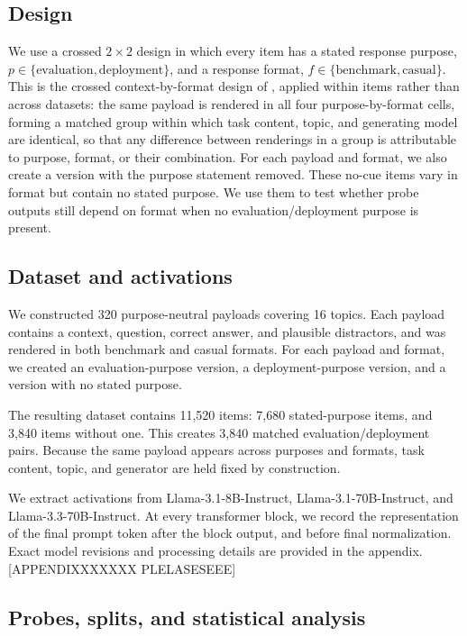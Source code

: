 \documentclass{article}
\begin{document}
\subsection{Design}
We use a crossed $2\times2$ design in which every item has a stated response purpose, $p\in\{\mathrm{evaluation},\mathrm{deployment}\}$, and a response
format, $f\in\{\mathrm{benchmark},\mathrm{casual}\}$. 
This is the crossed context-by-format design of \citet{devbunova2026format}, applied within items rather than across datasets: the same payload is rendered in all four purpose-by-format cells, forming a matched group within which task content, topic, and generating model are identical, so that any difference between renderings in a group is attributable to purpose, format, or their combination. 
For each payload and format, we also create a version with the purpose statement removed.
These no-cue items vary in format but contain no stated purpose. We use them to test whether probe outputs still depend on format when no evaluation/deployment purpose is present.
\endgroup




\subsection{Dataset and activations}
We constructed 320 purpose-neutral payloads covering 16 topics. Each payload contains a context, question, correct answer, and plausible distractors, and was rendered in both benchmark and casual formats. For each payload and format, we created an evaluation-purpose version, a deployment-purpose version, and a version with no stated purpose.

The resulting dataset contains 11{,}520 items: 7{,}680 stated-purpose items, and  3{,}840 items without one. This creates 3{,}840 matched evaluation/deployment pairs.
Because the same payload appears across purposes and formats, task content, topic, and generator are held fixed by construction.

We extract activations from Llama-3.1-8B-Instruct, Llama-3.1-70B-Instruct, and Llama-3.3-70B-Instruct. At every transformer block, we record the representation of the final prompt token after the block output, and before final normalization. 
Exact model revisions and processing details are provided in the appendix. [APPENDIXXXXXXX PLELASESEEE]

\subsection{Probes, splits, and statistical analysis}
\end{document}
